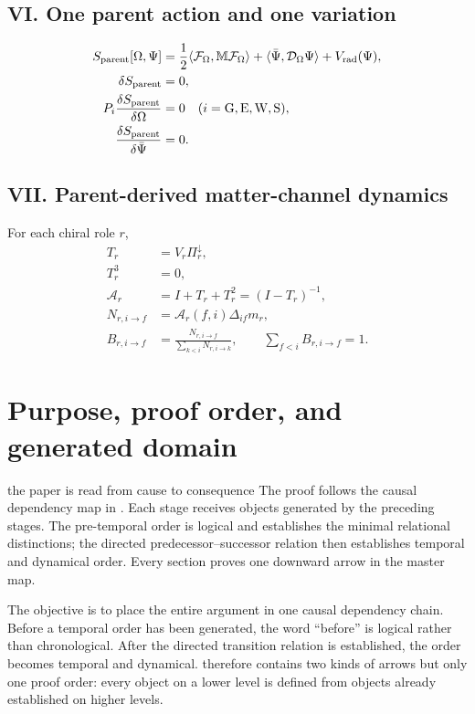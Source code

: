 \documentclass[11pt]{article}
\numberwithin{equation}{section}
\theoremstyle{remark}
\begin{document}
\subsection*{VI. One parent action and one variation}
\begin{align}
S_{\rm parent}[\Omega,\Psi]
&=\frac12\langle\mathcal F_{\Omega},\mathbb M\mathcal F_{\Omega}\rangle
+\langle\bar\Psi,\mathcal D_{\Omega}\Psi\rangle+V_{\rm rad}(\Psi),\\
\delta S_{\rm parent}&=0,\\
P_i\frac{\delta S_{\rm parent}}{\delta\Omega}&=0\quad(i={\rm G,E,W,S}),\\
\frac{\delta S_{\rm parent}}{\delta\bar\Psi}&=0.
\end{align}

\subsection*{VII. Parent-derived matter-channel dynamics}
For each chiral role $r$,
\begin{align}
T_r&=V_r\Pi_r^{\downarrow},\\
T_r^3&=0,\\
\mathcal A_r&=I+T_r+T_r^2=(I-T_r)^{-1},\\
N_{r,i\to f}&=\mathcal A_r(f,i)\Delta_{if}m_r,\\
B_{r,i\to f}&=\frac{N_{r,i\to f}}{\sum_{k<i}N_{r,i\to k}},\qquad
\sum_{f<i}B_{r,i\to f}=1.
\end{align}

\clearpage
\section{Purpose, proof order, and generated domain}
\begin{interpretivebridge}{the paper is read from cause to consequence}
The proof follows the causal dependency map in . Each stage receives objects generated by the preceding stages. The pre-temporal order is logical and establishes the minimal relational distinctions; the directed predecessor--successor relation then establishes temporal and dynamical order. Every section proves one downward arrow in the master map.
\end{interpretivebridge}

The objective is to place the entire argument in one causal dependency chain. Before a temporal order has been generated, the word ``before'' is logical rather than chronological. After the directed transition relation is established, the order becomes temporal and dynamical.  therefore contains two kinds of arrows but only one proof order: every object on a lower level is defined from objects already established on higher levels.
\end{document}
